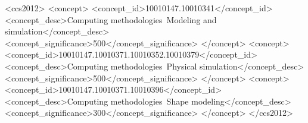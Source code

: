 \begin{CCSXML}
    <ccs2012>
    <concept>
    <concept_id>10010147.10010341</concept_id>
    <concept_desc>Computing methodologies~Modeling and simulation</concept_desc>
    <concept_significance>500</concept_significance>
    </concept>
    <concept>
    <concept_id>10010147.10010371.10010352.10010379</concept_id>
    <concept_desc>Computing methodologies~Physical simulation</concept_desc>
    <concept_significance>500</concept_significance>
    </concept>
    <concept>
    <concept_id>10010147.10010371.10010396</concept_id>
    <concept_desc>Computing methodologies~Shape modeling</concept_desc>
    <concept_significance>300</concept_significance>
    </concept>
    </ccs2012>
\end{CCSXML}

